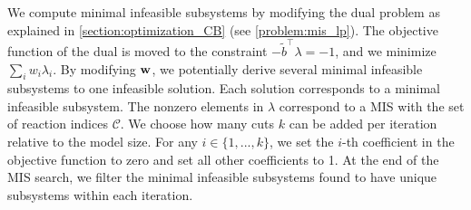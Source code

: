 
We compute minimal infeasible subsystems by modifying the dual problem as explained in \cref{section:optimization_CB} (see \cref{problem:mis_lp}). 
The objective function of the dual is moved to the constraint $-\tilde{b}^\intercal \lambda = -1$, and we minimize $\sum_i w_i \lambda_i$. By modifying $\bold w$, we potentially derive several minimal infeasible subsystems to one infeasible solution. Each solution corresponds to a minimal infeasible subsystem. The nonzero elements in $\lambda$ correspond to a MIS with the set of reaction indices $\mathcal{C}$. We choose how many cuts $k$ can be added per iteration relative to the model size. For any $i \in \{1,...,k\}$, we set the $i$-th coefficient in the objective function to zero and set all other coefficients to 1. At the end of the MIS search, we filter the minimal infeasible subsystems found to have unique subsystems within each iteration.


